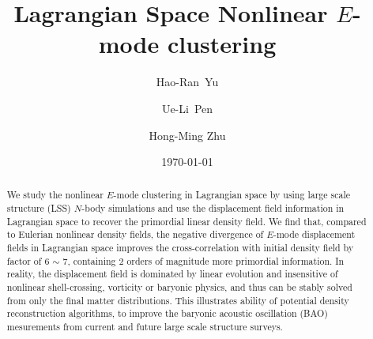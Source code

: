 \documentclass[aps,prd,twocolumn,superscriptaddress,amsfont,amssymb,amsmath,nofootinbib,showpacs,balancelastpage]{revtex4-1}
\begin{document}
\addtolength{\hoffset}{-0.525cm}
\addtolength{\textwidth}{1.05cm}
\title{Lagrangian Space Nonlinear $E$-mode clustering}

\author{Hao-Ran~Yu}%

\author{Ue-Li~Pen}%

\author{Hong-Ming Zhu}%

\date{\today}

\begin{abstract}
We study the nonlinear $E$-mode clustering in Lagrangian space
by using large scale structure (LSS) $N$-body simulations
and use the displacement field information in Lagrangian space
to recover the primordial linear density field.
We find that, compared to Eulerian nonlinear density fields,
the negative divergence of $E$-mode displacement fields
in Lagrangian space improves the cross-correlation with
initial density field by factor of 6 $\sim$ 7,
containing 2 orders of magnitude more primordial information. 
In reality, the displacement field is dominated by linear evolution
and insensitive of nonlinear shell-crossing, vorticity or
baryonic physics, and thus can be stably solved from only
the final matter distributions.
This illustrates ability of potential density reconstruction algorithms,
to improve the baryonic acoustic oscillation (BAO) mesurements
from current and future large scale structure surveys.


\end{abstract}
\end{document}
